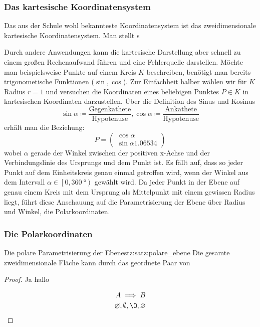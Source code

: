 \documentclass[12pt,a4paper]{report}
\begin{document}
		  \subsubsection{Das kartesische Koordinatensystem}\label{Mathe_KS_kartesisch}
			  Das aus der Schule wohl bekannteste Koordinatensystem ist das zweidimensionale kartesische Koordinatensystem.
			  Man stellt s

			  Durch andere Anwendungen kann die kartesische Darstellung aber schnell zu einem großen Rechenaufwand führen und eine Fehlerquelle darstellen.
			  Möchte man beispielsweise Punkte auf einem Kreis \(K\) beschreiben, benötigt man bereits trigonometische Funktionen (\(\sin, \cos\)).
			  Zur Einfachheit halber wählen wir für \(K\) Radius \(r = 1\) und versuchen die Koordinaten eines beliebigen Punktes \(P \in K\) in kartesischen Koordinaten darzustellen.
			  Über die Definition des Sinus und Kosinus
			  \[
				  \sin \alpha \coloneq \frac{\text{Gegenkathete}}{\text{Hypotenuse}}, \cos \alpha \coloneq \frac{\text{Ankathete}}{\text{Hypotenuse}}
			  \]
			  erhält man die Beziehung:
			  \[
				  P = \begin{pmatrix}
					  \cos\alpha \\
					  \sin\alpha
					  1.06534
				  \end{pmatrix}
			  \]
			  wobei \(\alpha\) gerade der Winkel zwischen der positiven x-Achse und der Verbindungslinie des Ursprungs und dem Punkt ist.
			  Es fällt auf, dass so jeder Punkt auf dem Einheitskreis genau einmal getroffen wird, wenn der Winkel aus dem Intervall \(\alpha\in \left[ 0,\SI{360}{\degree}\right)\) gewählt wird.
			  Da jeder Punkt in der Ebene auf genau einem Kreis mit dem Ursprung als Mittelpunkt mit einem gewissen Radius liegt, führt diese Anschauung auf die Parametrisierung der Ebene über Radius und Winkel, die Polarkoordinaten.

		  \subsubsection{Die Polarkoordinaten}\label{Mathe_KS_polar}
			  \begin{satz}{Die polare Parametrisierung der Ebene}{stz:satz:polare_ebene}
				  Die gesamte zweidimensionale Fläche kann durch das geordnete Paar von
			  \end{satz}
			  \begin{proof}Ja hallo

				  \begin{align*}
					  A \implies B \\
					  \o, \emptyset, \O, \varnothing
				  \end{align*}
			  \end{proof}
\end{document}
